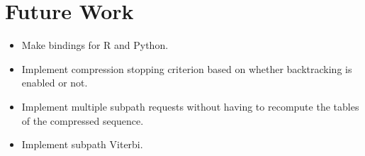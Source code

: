 \section{Future Work}

\begin{itemize}
\item Make bindings for R and Python.
\item Implement compression stopping criterion based on whether backtracking is
  enabled or not.
\item Implement multiple subpath requests without having to recompute the
  tables of the compressed sequence.
\item Implement subpath Viterbi.
\end{itemize}

